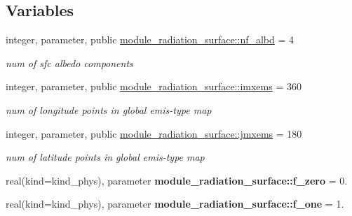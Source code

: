 \subsection*{Variables}
\begin{DoxyCompactItemize}
\item 
\mbox{\label{group__module__radiation__surface_gab7800982c900bd632ca74d5e7d2b5ab3}} 
integer, parameter, public \hyperlink{group__module__radiation__surface_gab7800982c900bd632ca74d5e7d2b5ab3}{module\+\_\+radiation\+\_\+surface\+::nf\+\_\+albd} = 4
\begin{DoxyCompactList}\small\item\em num of sfc albedo components \end{DoxyCompactList}\item 
\mbox{\label{group__module__radiation__surface_gaab4b9853c71ff40f8db2aa78b7cab265}} 
integer, parameter, public \hyperlink{group__module__radiation__surface_gaab4b9853c71ff40f8db2aa78b7cab265}{module\+\_\+radiation\+\_\+surface\+::imxems} = 360
\begin{DoxyCompactList}\small\item\em num of longitude points in global emis-\/type map \end{DoxyCompactList}\item 
\mbox{\label{group__module__radiation__surface_ga3922674f1c727d517ba5b0f7f5093970}} 
integer, parameter, public \hyperlink{group__module__radiation__surface_ga3922674f1c727d517ba5b0f7f5093970}{module\+\_\+radiation\+\_\+surface\+::jmxems} = 180
\begin{DoxyCompactList}\small\item\em num of latitude points in global emis-\/type map \end{DoxyCompactList}\item 
\mbox{\label{group__module__radiation__surface_ga86e4f42e46e188303b9a8e4d503d1acb}} 
real(kind=kind\+\_\+phys), parameter {\bfseries module\+\_\+radiation\+\_\+surface\+::f\+\_\+zero} = 0.
\item 
\mbox{\label{group__module__radiation__surface_ga91cec823f595387c92d659d89f307f42}} 
real(kind=kind\+\_\+phys), parameter {\bfseries module\+\_\+radiation\+\_\+surface\+::f\+\_\+one} = 1.

\end{DoxyCompactItemize}

